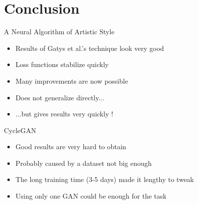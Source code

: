 \documentclass[12pt]{beamer}
\begin{document}
    
    \section{Conclusion}
    
    \begin{frame}{A Neural Algorithm of Artistic Style}
        \begin{itemize}
            \item Results of Gatys et al.'s technique look very good
            \item Loss functions stabilize quickly
            \item Many improvements are now possible
        \end{itemize}
        
        \vspace{2em}
        
        \begin{itemize}
            \item Does not generalize directly...
            \item ...but gives results very quickly !
        \end{itemize}
    \end{frame}
    
    \begin{frame}{CycleGAN}
        \begin{itemize}
            \item Good results are very hard to obtain
            \item Probably caused by a dataset not big enough
            \item The long training time (3-5 days) made it lengthy to tweak
            \item Using only one GAN could be enough for the task
        \end{itemize}
    \end{frame}
    
\end{document}
